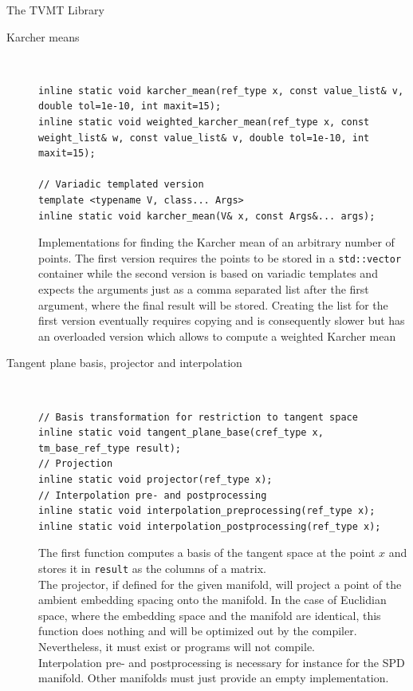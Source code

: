 \begin{chapter}{The TVMT Library}
\begin{description}
    \item[Karcher means] \hfill \\
	\cppinline
	\begin{lstlisting}
inline static void karcher_mean(ref_type x, const value_list& v, double tol=1e-10, int maxit=15);
inline static void weighted_karcher_mean(ref_type x, const weight_list& w, const value_list& v, double tol=1e-10, int maxit=15);

// Variadic templated version
template <typename V, class... Args>
inline static void karcher_mean(V& x, const Args&... args);
	\end{lstlisting}
	
	Implementations for finding the Karcher mean of an arbitrary number of points. The first version requires the points to be stored in a \texttt{std::vector} container while
	the second version is based on variadic templates and expects the arguments just as a comma separated list after the first argument, where the final result will be stored.
	Creating the list for the first version eventually requires copying and is consequently slower but has an overloaded version which allows to compute a weighted Karcher mean
    
    \item[Tangent plane basis, projector and interpolation] \hfill \\
	\cppinline
	\begin{lstlisting}
// Basis transformation for restriction to tangent space
inline static void tangent_plane_base(cref_type x, tm_base_ref_type result);
// Projection
inline static void projector(ref_type x);
// Interpolation pre- and postprocessing
inline static void interpolation_preprocessing(ref_type x);
inline static void interpolation_postprocessing(ref_type x);
	\end{lstlisting}

	The first function computes a basis of the tangent space at the point $x$ and stores it in \texttt{result} as the columns of a matrix.\\
	The projector, if defined for the given manifold, will project a point of the ambient embedding spacing onto the manifold. In the case of Euclidian space, where the 
	embedding space and the manifold are identical, this function does nothing and will be optimized out by the compiler. Nevertheless, it must exist or programs will not compile.\\
	Interpolation pre- and postprocessing is necessary for instance for the SPD manifold. Other manifolds must just provide an empty implementation.
\end{description}

\end{chapter}

